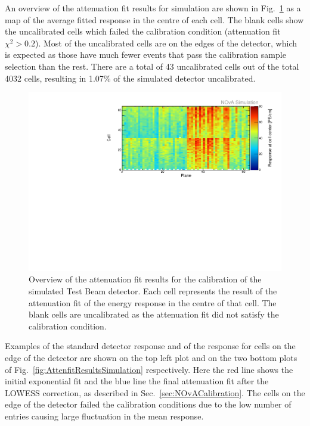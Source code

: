An overview of the attenuation fit results for simulation are shown in Fig.~\ref{fig:CellCentreResponseSim} as a map of the average fitted response in the centre of each cell. The blank cells show the uncalibrated cells which failed the calibration condition (attenuation fit $\chi^2>0.2$). Most of the uncalibrated cells are on the edges of the detector, which is expected as those have much fewer events that pass the calibration sample selection than the rest. There are a total of 43 uncalibrated cells out of the total 4032 cells, resulting in 1.07\% of the simulated detector uncalibrated.

\begin{figure}[h]
\centering
\includegraphics[width=\textwidth]{Plots/TBCalibration/CellResponseAtCentre_Prod4DataBasedSim_Limited_NOvAPlotStyle.pdf}
\caption[Map of fitted response at cell centre for simulation]{Overview of the attenuation fit results for the calibration of the simulated Test Beam detector. Each cell represents the result of the attenuation fit of the energy response in the centre of that cell. The blank cells are uncalibrated as the attenuation fit did not satisfy the calibration condition.}
\label{fig:CellCentreResponseSim}
\end{figure}

Examples of the standard detector response and of the response for cells on the edge of the detector are shown on the top left plot and on the two bottom plots of Fig.~\ref{fig:AttenfitResultsSimulation} respectively. Here the red line shows the initial exponential fit and the blue line the final attenuation fit after the \gls{LOWESS} correction, as described in Sec.~\ref{sec:NOvACalibration}. The cells on the edge of the detector failed the calibration conditions due to the low number of entries causing large fluctuation in the mean response.

